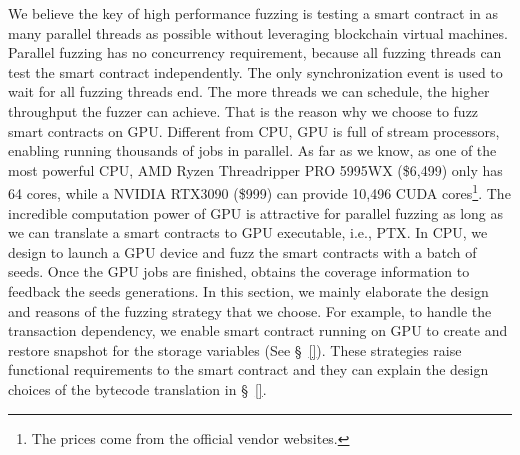 We believe the key of high performance fuzzing is testing a smart contract in as many parallel threads as possible without leveraging blockchain virtual machines. 
Parallel fuzzing has no concurrency requirement, because all fuzzing threads can test the smart contract independently. The only synchronization event is used to wait for all fuzzing threads end. The more threads we can schedule, the higher throughput the fuzzer can achieve.
That is the reason why we choose to fuzz smart contracts on GPU. 
Different from CPU, GPU is full of stream processors, enabling running thousands of jobs in parallel. 
As far as we know, as one of the most powerful CPU, AMD Ryzen Threadripper PRO 5995WX (\$6,499) only has 64 cores, while a NVIDIA RTX3090 (\$999) can provide 10,496 CUDA cores\footnote{The prices come from the official vendor websites.}. 
The incredible computation power of GPU is attractive for parallel fuzzing as long as we can translate a smart contracts to GPU executable, i.e., PTX\cite{}. 
%
In CPU, we design {\runner} to launch a GPU device and fuzz the smart contracts with a batch of seeds. Once the GPU jobs are finished, {\runner} obtains the coverage information to feedback the seeds generations. 
%
In this section, we mainly elaborate the design and reasons of the fuzzing strategy that we choose. 
For example, to handle the transaction dependency, we enable smart contract running on GPU to create and restore snapshot for the storage variables (See \S~\ref{}). 
These strategies raise functional requirements to the smart contract and they can explain the design choices of the bytecode translation in \S~\ref{}.

%


